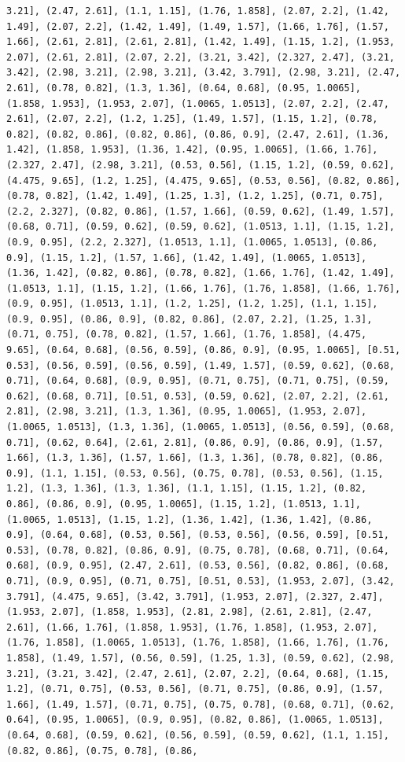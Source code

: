\documentclass[12pt,fleqn]{article}\usepackage{../common}
\begin{document}
\begin{verbatim}
3.21], (2.47, 2.61], (1.1, 1.15], (1.76, 1.858], (2.07, 2.2], (1.42, 1.49], (2.07, 2.2], (1.42, 1.49], (1.49, 1.57], (1.66, 1.76], (1.57, 1.66], (2.61, 2.81], (2.61, 2.81], (1.42, 1.49], (1.15, 1.2], (1.953, 2.07], (2.61, 2.81], (2.07, 2.2], (3.21, 3.42], (2.327, 2.47], (3.21, 3.42], (2.98, 3.21], (2.98, 3.21], (3.42, 3.791], (2.98, 3.21], (2.47, 2.61], (0.78, 0.82], (1.3, 1.36], (0.64, 0.68], (0.95, 1.0065], (1.858, 1.953], (1.953, 2.07], (1.0065, 1.0513], (2.07, 2.2], (2.47, 2.61], (2.07, 2.2], (1.2, 1.25], (1.49, 1.57], (1.15, 1.2], (0.78, 0.82], (0.82, 0.86], (0.82, 0.86], (0.86, 0.9], (2.47, 2.61], (1.36, 1.42], (1.858, 1.953], (1.36, 1.42], (0.95, 1.0065], (1.66, 1.76], (2.327, 2.47], (2.98, 3.21], (0.53, 0.56], (1.15, 1.2], (0.59, 0.62], (4.475, 9.65], (1.2, 1.25], (4.475, 9.65], (0.53, 0.56], (0.82, 0.86], (0.78, 0.82], (1.42, 1.49], (1.25, 1.3], (1.2, 1.25], (0.71, 0.75], (2.2, 2.327], (0.82, 0.86], (1.57, 1.66], (0.59, 0.62], (1.49, 1.57], (0.68, 0.71], (0.59, 0.62], (0.59, 0.62], (1.0513, 1.1], (1.15, 1.2], (0.9, 0.95], (2.2, 2.327], (1.0513, 1.1], (1.0065, 1.0513], (0.86, 0.9], (1.15, 1.2], (1.57, 1.66], (1.42, 1.49], (1.0065, 1.0513], (1.36, 1.42], (0.82, 0.86], (0.78, 0.82], (1.66, 1.76], (1.42, 1.49], (1.0513, 1.1], (1.15, 1.2], (1.66, 1.76], (1.76, 1.858], (1.66, 1.76], (0.9, 0.95], (1.0513, 1.1], (1.2, 1.25], (1.2, 1.25], (1.1, 1.15], (0.9, 0.95], (0.86, 0.9], (0.82, 0.86], (2.07, 2.2], (1.25, 1.3], (0.71, 0.75], (0.78, 0.82], (1.57, 1.66], (1.76, 1.858], (4.475, 9.65], (0.64, 0.68], (0.56, 0.59], (0.86, 0.9], (0.95, 1.0065], [0.51, 0.53], (0.56, 0.59], (0.56, 0.59], (1.49, 1.57], (0.59, 0.62], (0.68, 0.71], (0.64, 0.68], (0.9, 0.95], (0.71, 0.75], (0.71, 0.75], (0.59, 0.62], (0.68, 0.71], [0.51, 0.53], (0.59, 0.62], (2.07, 2.2], (2.61, 2.81], (2.98, 3.21], (1.3, 1.36], (0.95, 1.0065], (1.953, 2.07], (1.0065, 1.0513], (1.3, 1.36], (1.0065, 1.0513], (0.56, 0.59], (0.68, 0.71], (0.62, 0.64], (2.61, 2.81], (0.86, 0.9], (0.86, 0.9], (1.57, 1.66], (1.3, 1.36], (1.57, 1.66], (1.3, 1.36], (0.78, 0.82], (0.86, 0.9], (1.1, 1.15], (0.53, 0.56], (0.75, 0.78], (0.53, 0.56], (1.15, 1.2], (1.3, 1.36], (1.3, 1.36], (1.1, 1.15], (1.15, 1.2], (0.82, 0.86], (0.86, 0.9], (0.95, 1.0065], (1.15, 1.2], (1.0513, 1.1], (1.0065, 1.0513], (1.15, 1.2], (1.36, 1.42], (1.36, 1.42], (0.86, 0.9], (0.64, 0.68], (0.53, 0.56], (0.53, 0.56], (0.56, 0.59], [0.51, 0.53], (0.78, 0.82], (0.86, 0.9], (0.75, 0.78], (0.68, 0.71], (0.64, 0.68], (0.9, 0.95], (2.47, 2.61], (0.53, 0.56], (0.82, 0.86], (0.68, 0.71], (0.9, 0.95], (0.71, 0.75], [0.51, 0.53], (1.953, 2.07], (3.42, 3.791], (4.475, 9.65], (3.42, 3.791], (1.953, 2.07], (2.327, 2.47], (1.953, 2.07], (1.858, 1.953], (2.81, 2.98], (2.61, 2.81], (2.47, 2.61], (1.66, 1.76], (1.858, 1.953], (1.76, 1.858], (1.953, 2.07], (1.76, 1.858], (1.0065, 1.0513], (1.76, 1.858], (1.66, 1.76], (1.76, 1.858], (1.49, 1.57], (0.56, 0.59], (1.25, 1.3], (0.59, 0.62], (2.98, 3.21], (3.21, 3.42], (2.47, 2.61], (2.07, 2.2], (0.64, 0.68], (1.15, 1.2], (0.71, 0.75], (0.53, 0.56], (0.71, 0.75], (0.86, 0.9], (1.57, 1.66], (1.49, 1.57], (0.71, 0.75], (0.75, 0.78], (0.68, 0.71], (0.62, 0.64], (0.95, 1.0065], (0.9, 0.95], (0.82, 0.86], (1.0065, 1.0513], (0.64, 0.68], (0.59, 0.62], (0.56, 0.59], (0.59, 0.62], (1.1, 1.15], (0.82, 0.86], (0.75, 0.78], (0.86, 
\end{verbatim}
\end{document}

